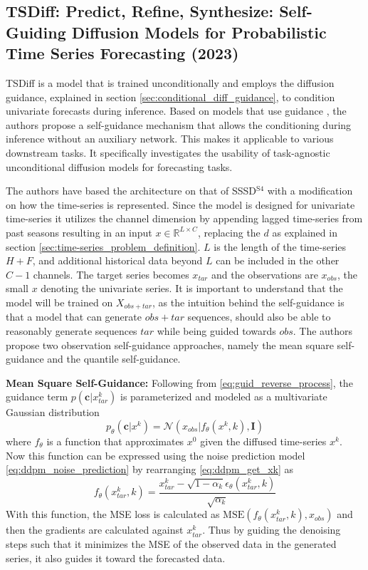 \subsection{TSDiff: Predict, Refine, Synthesize: Self-Guiding Diffusion Models for Probabilistic Time Series Forecasting (2023) \cite{kollovieh_predict_2023}} \label{sec:tsdiff}
TSDiff is a model that is trained unconditionally and employs the diffusion guidance, explained in section \ref{sec:conditional_diff_guidance}, to condition univariate forecasts during inference. Based on models that use guidance \cite{dhariwal_diffusion_2021, ho_classifier-free_2022}, the authors propose a self-guidance mechanism that allows the conditioning during inference without an auxiliary network. This makes it applicable to various downstream tasks. It specifically investigates the usability of task-agnostic unconditional diffusion models for forecasting tasks.

The authors have based the architecture on that of SSSD$^{\text{S4}}$ with a modification on how the time-series is represented. Since the model is designed for univariate time-series it utilizes the channel dimension by appending lagged time-series from past seasons resulting in an input $x \in \mathbb{R}^{L \times C}$, replacing the $d$ as explained in section \ref{sec:time-series_problem_definition}. $L$ is the length of the time-series $H+F$, and additional historical data beyond $L$ can be included in the other $C-1$ channels. The target series becomes $x_{tar}$ and the observations are $x_{obs}$, the small $x$ denoting the univariate series. It is important to understand that the model will be trained on $X_{obs+tar}$, as the intuition behind the self-guidance is that a model that can generate $obs+tar$ sequences, should also be able to reasonably generate sequences $tar$ while being guided towards $obs$.
The authors propose two observation self-guidance approaches, namely the mean square self-guidance and the quantile self-guidance. 

\textbf{Mean Square Self-Guidance:}
Following from \autoref{eq:guid_reverse_process}, the guidance term $p(\mathbf{c}|x_{tar}^k)$ is parameterized and modeled as a multivariate Gaussian distribution
\begin{equation}
    p_\theta(\mathbf{c} | x^k) = \mathcal{N}(x_{obs}| f_\theta(x^k, k), \mathbf{I})    
\end{equation}
where $f_\theta$ is a function that approximates $x^0$ given the diffused time-series $x^k$. Now this function can be expressed using the noise prediction model \eqref{eq:ddpm_noise_prediction} by rearranging \autoref{eq:ddpm_get_xk} as
\begin{equation}
    f_\theta(x_{tar}^k, k) = \frac{x_{tar}^k - \sqrt{1 - \alpha_k} \epsilon_\theta(x_{tar}^k, k)}{\sqrt{\alpha_k}}
\end{equation}
With this function, the MSE loss is calculated as $\text{MSE}(f_\theta(x_{tar}^k, k), x_{obs})$ and then the gradients are calculated against $x_{tar}^k$. Thus by guiding the denoising steps such that it minimizes the MSE of the observed data in the generated series, it also guides it toward the forecasted data.

